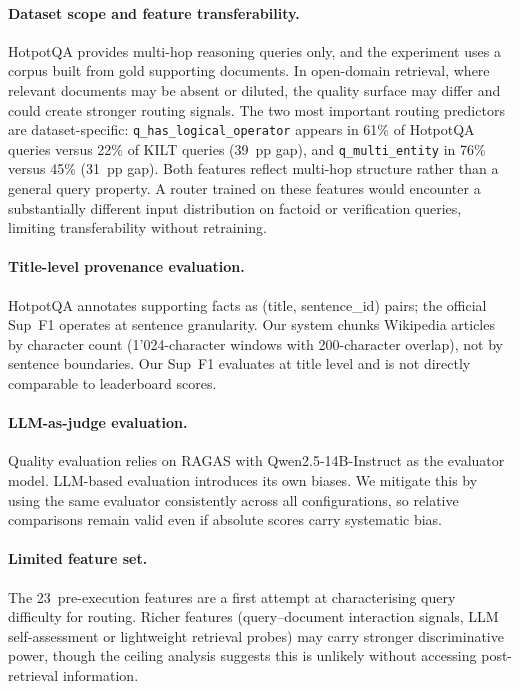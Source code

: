 \paragraph{Dataset scope and feature transferability.}
HotpotQA provides multi-hop reasoning queries only, and the experiment
uses a corpus built from gold supporting documents.  In open-domain
retrieval, where relevant documents may be absent or diluted, the quality
surface may differ and could create stronger routing signals.  The two
most important routing predictors are dataset-specific:
\texttt{q\_has\_logical\_operator} appears in 61\% of HotpotQA queries
versus 22\% of KILT queries (39~pp gap), and \texttt{q\_multi\_entity}
in 76\% versus 45\% (31~pp gap).  Both features reflect multi-hop
structure rather than a general query property.  A router trained on
these features would encounter a substantially different input
distribution on factoid or verification queries, limiting
transferability without retraining.

\paragraph{Title-level provenance evaluation.}
HotpotQA annotates supporting facts as (title, sentence\_id) pairs; the
official Sup~F1 operates at sentence granularity.  Our system chunks
Wikipedia articles by character count (1{'}024-character windows with
200-character overlap), not by sentence boundaries.  Our Sup~F1 evaluates
at title level and is not directly comparable to leaderboard scores.

\paragraph{LLM-as-judge evaluation.}
Quality evaluation relies on RAGAS with Qwen2.5-14B-Instruct as the
evaluator model.  LLM-based evaluation introduces its own biases.  We
mitigate this by using the same evaluator consistently across all
configurations, so relative comparisons remain valid even if absolute
scores carry systematic bias.

\paragraph{Limited feature set.}
The 23~pre-execution features are a first attempt at characterising query
difficulty for routing.  Richer features (query--document interaction
signals, LLM self-assessment or lightweight retrieval probes) may carry
stronger discriminative power, though the ceiling analysis suggests this
is unlikely without accessing post-retrieval information.


